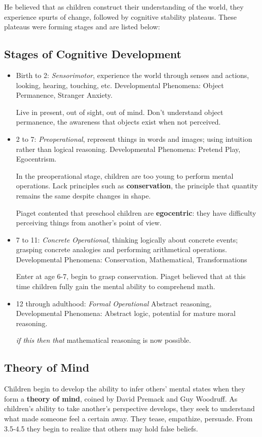 \documentclass[12pt]{article}
\begin{document}
He believed that as children construct their understanding of the world, they experience spurts of change, followed by cognitive stability plateaus. These plateaus were forming stages and are listed below:

\subsection*{Stages of Cognitive Development}
\begin{itemize}
\item Birth to 2: \textit{Sensorimotor}, experience the world through senses and actions, looking, hearing, touching, etc. Developmental Phenomena: Object Permanence, Stranger Anxiety.

Live in present, out of sight, out of mind. Don't understand object permanence, the awareness that objects exist when not perceived.

\item 2 to 7: \textit{Preoperational}, represent things in words and images; using intuition rather than logical reasoning. Developmental Phenomena: Pretend Play, Egocentrism.

In the preoperational stage, children are too young to perform mental operations. Lack principles such as \textbf{conservation}, the principle that quantity remains the same despite changes in shape. 

Piaget contented that preschool children are \textbf{egocentric}: they have difficulty perceiving things from another's point of view. 

\item 7 to 11: \textit{Concrete Operational}, thinking logically about concrete events; grasping concrete analogies and performing arithmetical operations. Developmental Phenomena: Conservation, Mathematical, Transformations

Enter at age 6-7, begin to grasp conservation. Piaget believed that at this time children fully gain the mental ability to comprehend math. 

\item 12 through adulthood: \textit{Formal Operational} Abstract reasoning, Developmental Phenomena: Abstract logic, potential for mature moral reasoning. 

\textit{if this then that} mathematical reasoning is now possible. 
\end{itemize}

\subsection*{Theory of Mind}
Children begin to develop the ability to infer others' mental states when they form a \textbf{theory of mind}, coined by David Premack and Guy Woodruff. As children's ability to take another's perspective develops, they seek to understand what made someone feel a certain away. They tease, empathize, persuade. From 3.5-4.5 they begin to realize that others may hold false beliefs.
\end{document}
